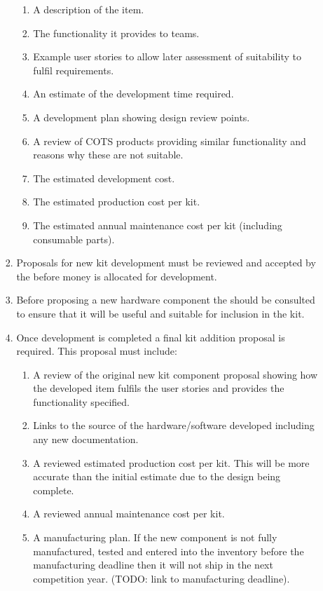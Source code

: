 \begin{draft}
\begin{enumerate}
\begin{enumerate}
\begin{enumerate}
\begin{enumerate}
            \item A description of the item.
            \item The functionality it provides to teams.
            \item Example user stories to allow later assessment of suitability to fulfil requirements.
            \item An estimate of the development time required.
            \item A development plan showing design review points.
            \item A review of COTS products providing similar functionality and reasons why these are not suitable.
            \item The estimated development cost.
            \item The estimated production cost per kit.
            \item The estimated annual maintenance cost per kit (including consumable parts).
          \end{enumerate}
        \item Proposals for new kit development must be reviewed and accepted by the  before money is allocated for development.
        \item Before proposing a new hardware component the  should be consulted to ensure that it will be useful and suitable for inclusion in the kit.
        \item Once development is completed a final kit addition proposal is required. This proposal must include:
          \begin{enumerate}
            \item A review of the original new kit component proposal showing how the developed item fulfils the user stories and provides the functionality specified.
            \item Links to the source of the hardware/software developed including any new documentation.
            \item A reviewed estimated production cost per kit. This will be more accurate than the initial estimate due to the design being complete.
            \item A reviewed annual maintenance cost per kit.
            \item A manufacturing plan. If the new component is not fully manufactured, tested and entered into the inventory before the manufacturing deadline then it will not ship in the next competition year. (TODO: link to manufacturing deadline).

\end{enumerate}
\end{enumerate}
\end{enumerate}
\end{enumerate}
\end{draft}

